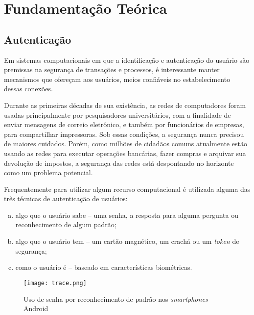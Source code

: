 \chapter{Fundamentação Teórica}\label{cha:fundamentacao}
\section{Autenticação}
Em sistemas computacionais em que a identificação e autenticação do usuário são premissas na segurança de transações e processos, é interessante manter mecanismos que ofereçam aos usuários, meios confiáveis no estabelecimento dessas conexões.
\begin{citacao}
Durante as primeiras décadas de sua existência, as redes de computadores foram usadas principalmente por pesquisadores universitários, com a finalidade de enviar mensagens de correio eletrônico, e também por funcionários de empresas, para compartilhar impressoras. Sob essas condições, a segurança nunca precisou de maiores cuidados. Porém, como milhões de cidadãos comuns atualmente estão usando as redes para executar operações bancárias, fazer compras e arquivar sua devolução de impostos, a segurança das redes está despontando no horizonte como um problema potencial.\cite{tanenbaum2011computer}
\end{citacao}
Frequentemente para utilizar algum recurso computacional é utilizada alguma das três técnicas de autenticação de usuários:

\begin{footnotesize}
	\begin{enumerate}[(a)]
	\item algo que o usuário sabe – uma senha, a resposta para alguma pergunta ou reconhecimento de algum padrão;
	\item algo que o usuário tem – um cartão magnético, um crachá ou um \textit{token} de segurança;
	\item como o usuário é – baseado em características biométricas.
	\end{enumerate}
\end{footnotesize}

\begin{figure}[!htb]
	\centering
	\texttt{[image: trace.png]} %
	\small
	\caption[Uso de senha por reconhecimento de padrão]{Uso de senha por reconhecimento de padrão nos \textit{smartphones} Android}
	\label{fig:trace}
\end{figure}

